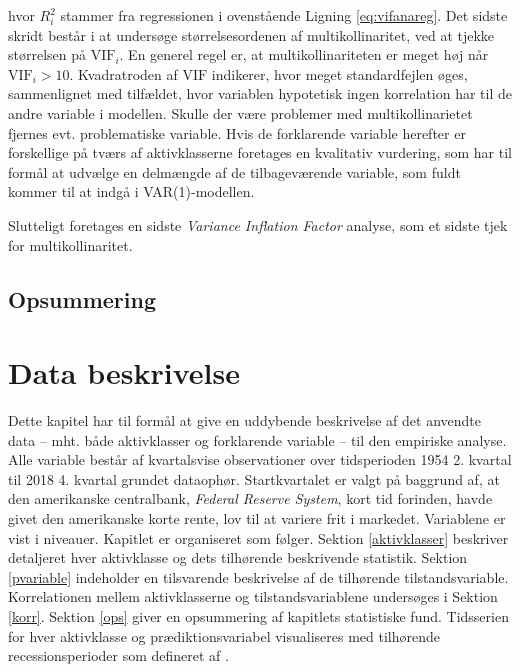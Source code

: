 \documentclass[
  a4paper,
  oneside]{memoir}
\begin{document}
hvor \(R_i^2\) stammer fra regressionen i ovenstående Ligning \eqref{eq:vifanareg}. Det sidste skridt består i at undersøge størrelsesordenen af multikollinaritet, ved at tjekke størrelsen på \(\text{VIF}_i\). En generel regel er, at multikollinariteten er meget høj når \(\text{VIF}_i>10\). Kvadratroden af \(\text{VIF}\) indikerer, hvor meget standardfejlen øges, sammenlignet med tilfældet, hvor variablen hypotetisk ingen korrelation har til de andre variable i modellen. Skulle der være problemer med multikollinarietet fjernes evt. problematiske variable. Hvis de forklarende variable herefter er forskellige på tværs af aktivklasserne foretages en kvalitativ vurdering, som har til formål at udvælge en delmængde af de tilbageværende variable, som fuldt kommer til at indgå i VAR(1)-modellen.

Slutteligt foretages en sidste \emph{Variance Inflation Factor} analyse, som et sidste tjek for multikollinaritet.

\hypertarget{opsummering-2}{%
\section{Opsummering}\label{opsummering-2}}

\hypertarget{kapiteldatab}{%
\chapter{Data beskrivelse}\label{kapiteldatab}}

Dette kapitel har til formål at give en uddybende beskrivelse af det anvendte data -- mht. både aktivklasser og forklarende variable -- til den empiriske analyse. Alle variable består af kvartalsvise observationer over tidsperioden 1954 2. kvartal til 2018 4. kvartal grundet dataophør. Startkvartalet er valgt på baggrund af, at den amerikanske centralbank, \emph{Federal Reserve System}, kort tid forinden, havde givet den amerikanske korte rente, lov til at variere frit i markedet. Variablene er vist i niveauer. Kapitlet er organiseret som følger. Sektion \ref{aktivklasser} beskriver detaljeret hver aktivklasse og dets tilhørende beskrivende statistik. Sektion \ref{pvariable} indeholder en tilsvarende beskrivelse af de tilhørende tilstandsvariable. Korrelationen mellem aktivklasserne og tilstandsvariablene undersøges i Sektion \ref{korr}. Sektion \ref{ops} giver en opsummering af kapitlets statistiske fund. Tidsserien for hver aktivklasse og prædiktionsvariabel visualiseres med tilhørende recessionsperioder som defineret af \citep{NBER2020}.
\end{document}
